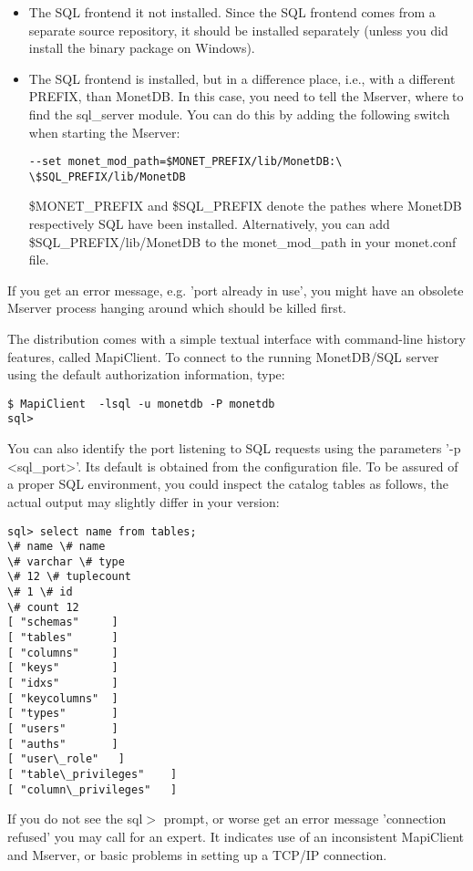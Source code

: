 \documentclass[10pt,twocolumn,fleqn]{article}
\begin{document}
\begin{itemize}
\item
The SQL frontend it not installed. Since the SQL frontend comes from a separate 
source repository,
it should be installed separately (unless you did install the binary package on Windows).
\item The SQL frontend is installed, but in a difference place, i.e., with a different 
PREFIX, than MonetDB.
In this case, you need to tell the Mserver, where to find the sql\_server module.
You can do this by 
adding the following switch when starting the Mserver:
\begin{verbatim}
--set monet_mod_path=$MONET_PREFIX/lib/MonetDB:\
\$SQL_PREFIX/lib/MonetDB
\end{verbatim}
\$MONET\_PREFIX and \$SQL\_PREFIX denote the pathes where MonetDB respectively SQL have
been installed.
Alternatively, you can add \$SQL\_PREFIX/lib/MonetDB to the monet\_mod\_path in your
 monet.conf file.
\end{itemize}

If you get an error message, e.g. 'port already in use', you might have 
an obsolete Mserver process hanging around which should be killed first.

The distribution comes with a simple textual interface with
command-line history features, called MapiClient.
To connect to the running MonetDB/SQL server using the
default authorization information, type:

\begin{verbatim}
$ MapiClient  -lsql -u monetdb -P monetdb
sql>
\end{verbatim}
You can also identify the port listening to SQL requests using
the parameters '-p <sql\_port>'. Its default is obtained from
the configuration file.
To be assured of a proper SQL environment, you could inspect the catalog
tables as follows, the actual output may slightly differ in your version:
\begin{verbatim}
sql> select name from tables;
\# name \# name
\# varchar \# type
\# 12 \# tuplecount
\# 1 \# id
\# count 12
[ "schemas"     ]
[ "tables"      ]
[ "columns"     ]
[ "keys"        ]
[ "idxs"        ]
[ "keycolumns"  ]
[ "types"       ]
[ "users"       ]
[ "auths"       ]
[ "user\_role"   ]
[ "table\_privileges"    ]
[ "column\_privileges"   ]
\end{verbatim}

If you do not see the sql$>$ prompt, or worse get an error
message 'connection refused' you may call for an expert.
It indicates use of an inconsistent MapiClient and Mserver,
or basic problems in setting up a TCP/IP connection.
\end{document}
